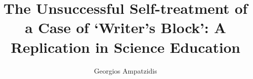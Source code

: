 \documentclass[twocolumn, serif, empirical, authordate]{jote-article}
\title{The Unsuccessful Self-treatment of a Case of `Writer’s Block': A Replication in Science Education}
\author[1]{Georgios Ampatzidis}
\affil[1]{Hellenic Open University, Parodos Aristotelous 18, 26335, Patras, Greece}
\begin{document}
    \begin{frontmatter}
    \maketitle

    \end{frontmatter}



\onecolumn
\nocite{*}
\printbibliography
\end{document}
